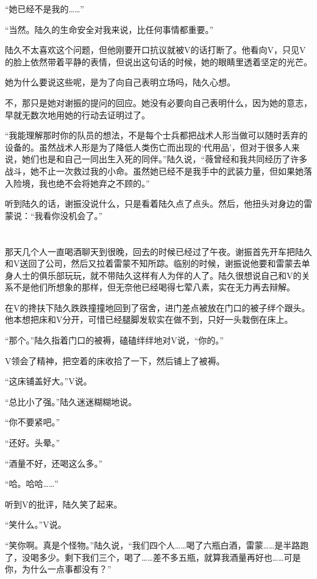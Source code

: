 “她已经不是我的……”

“当然。陆久的生命安全对我来说，比任何事情都重要。”

陆久不太喜欢这个问题，但他刚要开口抗议就被V的话打断了。他看向V，只见V的脸上依然带着平静的表情，但说出这句话的时候，她的眼睛里透着坚定的光芒。

她为什么要说这些呢，是为了向自己表明立场吗，陆久心想。

不，那只是她对谢振的提问的回应。她没有必要向自己表明什么，因为她的意志，早就无数次地用她的行动去证明过了。

“我能理解那时你的队员的想法，不是每个士兵都把战术人形当做可以随时丢弃的设备的。虽然战术人形是为了降低人类伤亡而出现的‘代用品’，但对于很多人来说，她们也是和自己一同出生入死的同伴。”陆久说，“薇曾经和我共同经历了许多战斗，她不止一次救过我的小命。虽然她已经不是我手中的武装力量，但如果她落入险境，我也绝不会将她弃之不顾的。”

听到陆久的话，谢振没说什么，只是看着陆久点了点头。然后，他扭头对身边的雷蒙说：“我看你没机会了。”



\section*{}

那天几个人一直喝酒聊天到很晚，回去的时候已经过了午夜。谢振首先开车把陆久和V送回了公司，然后又拉着雷蒙不知所踪。临别的时候，谢振说他要和雷蒙去单身人士的俱乐部玩玩，就不带陆久这样有人为伴的人了。陆久很想说自己和V的关系不是他们所想象的那样，但无奈他已经喝得七荤八素，实在无力再去辩解。

在V的搀扶下陆久跌跌撞撞地回到了宿舍，进门差点被放在门口的被子绊个跟头。他本想把床和V分开，可惜已经腿脚发软实在做不到，只好一头栽倒在床上。

“那个。”陆久指着门口的被褥，磕磕绊绊地对V说，“你的。”

V领会了精神，把空着的床收拾了一下，然后铺上了被褥。

“这床铺盖好大。”V说。

“总比小了强。”陆久迷迷糊糊地说。

“你不要紧吧。”

“还好。头晕。”

“酒量不好，还喝这么多。”

“哈。哈哈……”

听到V的批评，陆久笑了起来。

“笑什么。”V说。

“笑你啊。真是个怪物。”陆久说，“我们四个人……喝了六瓶白酒，雷蒙……是半路跑了，没喝多少。剩下我们三个，喝了……差不多五瓶，就算我酒量再好也……可是你，为什么一点事都没有？”

